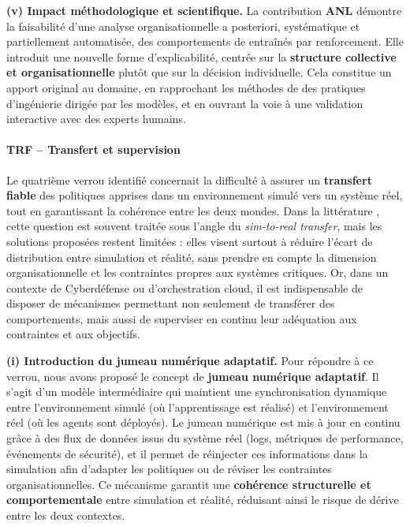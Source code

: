 \medskip
\noindent
\textbf{(v) Impact méthodologique et scientifique.}
La contribution \textbf{ANL} démontre la faisabilité d'une analyse organisationnelle a posteriori, systématique et partiellement automatisée, des comportements de  entraînés par renforcement.
Elle introduit une nouvelle forme d'explicabilité, centrée sur la \textbf{structure collective et organisationnelle} plutôt que sur la décision individuelle.
Cela constitue un apport original au domaine, en rapprochant les méthodes de  des pratiques d'ingénierie dirigée par les modèles, et en ouvrant la voie à une validation interactive avec des experts humains.

\paragraph{TRF – Transfert et supervision}

Le quatrième verrou identifié concernait la difficulté à assurer un \textbf{transfert fiable} des politiques apprises dans un environnement simulé vers un système réel, tout en garantissant la cohérence entre les deux mondes.
Dans la littérature , cette question est souvent traitée sous l'angle du \textit{sim-to-real transfer}, mais les solutions proposées restent limitées :
elles visent surtout à réduire l'écart de distribution entre simulation et réalité, sans prendre en compte la dimension organisationnelle et les contraintes propres aux systèmes critiques.
Or, dans un contexte de Cyberdéfense ou d'orchestration cloud, il est indispensable de disposer de mécanismes permettant non seulement de transférer des comportements, mais aussi de superviser en continu leur adéquation aux contraintes et aux objectifs.

\medskip
\noindent
\textbf{(i) Introduction du jumeau numérique adaptatif.}
Pour répondre à ce verrou, nous avons proposé le concept de \textbf{jumeau numérique adaptatif}.
Il s'agit d'un modèle intermédiaire qui maintient une synchronisation dynamique entre l'environnement simulé (où l'apprentissage est réalisé) et l'environnement réel (où les agents sont déployés).
Le jumeau numérique est mis à jour en continu grâce à des flux de données issus du système réel (logs, métriques de performance, événements de sécurité), et il permet de réinjecter ces informations dans la simulation afin d'adapter les politiques ou de réviser les contraintes organisationnelles.
Ce mécanisme garantit une \textbf{cohérence structurelle et comportementale} entre simulation et réalité, réduisant ainsi le risque de dérive entre les deux contextes.

